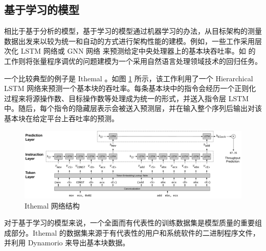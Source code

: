\subsection{基于学习的模型}


相比于基于分析的模型，基于学习的模型通过机器学习的办法，从目标架构的测量数据出发来以较为统一和自动的方式进行架构性能的建模。例如，一些工作采用层次化 LSTM 网络或 GNN 网络 \cite{pmlr-v97-mendis19a, 9975403}来预测给定中央处理器上的基本块吞吐率。如 \citet{10.1145/3575693.3575737} 的工作则将张量程序调优的问题建模为一个采用自然语言处理领域技术的回归任务。

一个比较典型的例子是 Ithemal \cite{pmlr-v97-mendis19a}。如图 \ref{fig:ithemal_overall} 所示，该工作利用了一个 Hierarchical LSTM 网络来预测一个基本块的吞吐率。每条基本块中的指令会经历一个正则化过程来将源操作数、目标操作数等处理成为统一的形式，并送入指令层 LSTM 中。随后，每个指令的隐藏层表示会被送入预测层，并在输入整个序列后输出对该基本块在给定平台上吞吐率的预测。

\begin{figure}[ht]
  \centering
  \includegraphics[width=\textwidth]{figures/diag_fullsystem.pdf}
  \vspace{-20pt}
  \caption{Ithemal 网络结构\cite{pmlr-v97-mendis19a}}
  \label{fig:ithemal_overall}
\end{figure}

对于基于学习的模型来说，一个全面而有代表性的训练数据集是模型质量的重要组成部分。Ithemal 的数据集来源于有代表性的用户和系统软件的二进制程序文件，并利用 Dynamorio \cite{10.1145/2365864.2151043} 来导出基本块数据。

